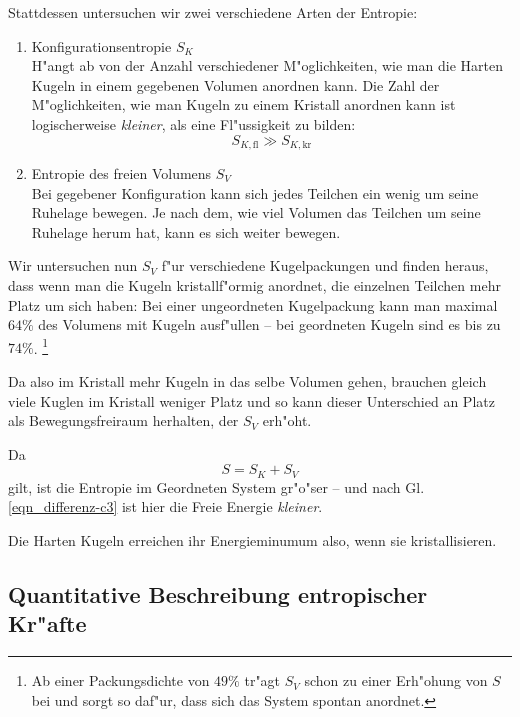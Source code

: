 Stattdessen untersuchen wir zwei verschiedene Arten der Entropie:
\begin{enumerate}
\item Konfigurationsentropie $S_K$\\
   H"angt ab von der Anzahl verschiedener M"oglichkeiten, wie man die
   Harten Kugeln in einem gegebenen Volumen anordnen kann. Die Zahl
   der M"oglichkeiten, wie man Kugeln zu einem Kristall anordnen kann
   ist logischerweise \emph{kleiner}, als eine Fl"ussigkeit zu bilden:
$$
S_{K, \text{fl}} \gg S_{K, \text{kr}}
$$
\item Entropie des freien Volumens $S_V$\\
   Bei gegebener Konfiguration kann sich jedes Teilchen ein wenig um
   seine Ruhelage bewegen. Je nach dem, wie viel Volumen das Teilchen
   um seine Ruhelage herum hat, kann es sich weiter bewegen.
\end{enumerate}

Wir untersuchen nun $S_V$ f"ur verschiedene Kugelpackungen und finden
heraus, dass wenn man die Kugeln kristallf"ormig anordnet, die
einzelnen Teilchen mehr Platz um sich haben: Bei einer ungeordneten
Kugelpackung kann man maximal $64\%$ des Volumens mit Kugeln ausf"ullen
-- bei geordneten Kugeln sind es bis zu $74\%$. \footnote{Ab einer
  Packungsdichte von $49\%$ tr"agt $S_V$ schon zu einer Erh"ohung von
  $S$ bei und sorgt so daf"ur, dass sich das System spontan anordnet.}

Da also im Kristall mehr Kugeln in das selbe Volumen gehen, brauchen
gleich viele Kuglen im Kristall weniger Platz und so kann dieser
Unterschied an Platz als Bewegungsfreiraum herhalten, der $S_V$
erh"oht.

Da
$$
S = S_K + S_V
$$
gilt, ist die Entropie im Geordneten System gr"o"ser -- und nach
Gl. \eqref{eqn_differenz-c3} ist hier die Freie Energie \emph{kleiner}.

\begin{Wichtig}
   Die Harten Kugeln erreichen ihr Energieminumum also, wenn sie
   kristallisieren.
\end{Wichtig}








\subsection{Quantitative Beschreibung entropischer Kr"afte}
\label{kap_quantitative-beschreibung-entropischer-krafte}


